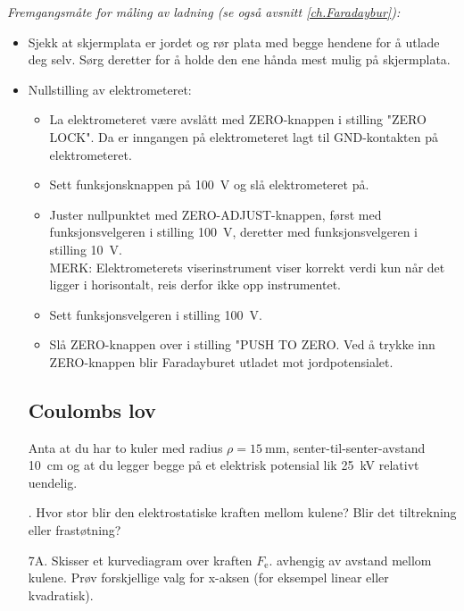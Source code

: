 \documentclass[../Elmag-labhefte-2020.tex]{subfiles}
\begin{document}
\emph{Fremgangsmåte for måling av ladning (se også avsnitt \ref{ch.Faradaybur}): }
\vspace{-4mm}
\begin{itemize}
    \item Sjekk at skjermplata er jordet og rør plata med begge hendene for å utlade deg selv. Sørg deretter for å holde den ene hånda mest mulig på skjermplata. 
    \item Nullstilling av  elektrometeret:
    \vspace{-2mm}
    \begin{itemize}
        \item La elektrometeret være avslått med ZERO-knappen i stilling "ZERO LOCK". Da er inngangen på elektrometeret lagt til GND-kontakten på elektrometeret.
        \item Sett funksjonsknappen på \SI{100}{\volt} og slå elektrometeret på.
        \item  Juster nullpunktet med ZERO-ADJUST-knappen, først med funksjonsvelgeren i stilling \SI{100}{\volt}, deretter med funksjonsvelgeren i stilling \SI{10}{\volt}.  \\
        MERK: Elektrometerets viserinstrument viser korrekt verdi kun når det ligger i horisontalt, reis derfor ikke opp instrumentet. 
        \item Sett funksjonsvelgeren i stilling \SI{100}{\volt}. 
        \item Slå ZERO-knappen over i stilling "PUSH TO ZERO.  Ved å trykke inn ZERO-knappen blir Faradayburet utladet mot jordpotensialet.
    \end{itemize}

\subsection{Coulombs lov \label{ch.coulomb.beregn.coulomb}}

Anta at du har to kuler med radius $\rho = \SI{15}{\milli\m}$, senter-til-senter-avstand \SI{10}{\cm} og at du legger begge på et elektrisk potensial lik \SI{25}{\kilo\volt} relativt uendelig. 

{. Hvor stor blir den elektrostatiske kraften mellom kulene? Blir det tiltrekning eller frastøtning?}


{\itsf 7A. Skisser et kurvediagram over kraften $F_\text{e}$. avhengig av avstand mellom kulene.} Prøv forskjellige valg for x-aksen (for eksempel linear eller kvadratisk).


\end{itemize}
\end{document}
